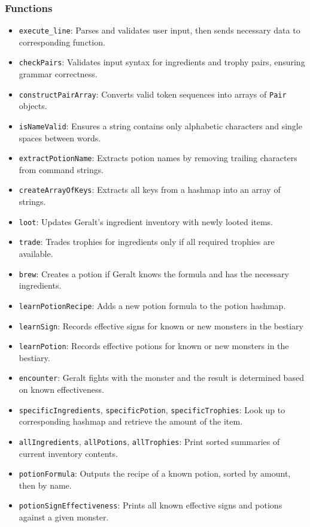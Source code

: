 \documentclass[a4paper,12pt]{article}
\begin{document}
\subsubsection{Functions}
\begin{itemize}
  \item \texttt{execute\_line}: Parses and validates user input, then sends necessary data to corresponding function.
  \item \texttt{checkPairs}: Validates input syntax for ingredients and trophy pairs, ensuring grammar correctness.
  \item \texttt{constructPairArray}: Converts valid token sequences into arrays of \texttt{Pair} objects.
  \item \texttt{isNameValid}: Ensures a string contains only alphabetic characters and single spaces between words.
  \item \texttt{extractPotionName}: Extracts potion names by removing trailing characters from command strings.
  \item \texttt{createArrayOfKeys}: Extracts all keys from a hashmap into an array of strings.
  \item \texttt{loot}: Updates Geralt's ingredient inventory with newly looted items.
  \item \texttt{trade}: Trades trophies for ingredients only if all required trophies are available.
  \item \texttt{brew}: Creates a potion if Geralt knows the formula and has the necessary ingredients.
  \item \texttt{learnPotionRecipe}: Adds a new potion formula to the potion hashmap.
  \item \texttt{learnSign}: Records effective signs for known or new monsters in the bestiary
  \item \texttt{learnPotion}: Records effective potions for known or new monsters in the bestiary.
  \item \texttt{encounter}: Geralt fights with the monster and the result is determined based on known effectiveness.
  \item \texttt{specificIngredients}, \texttt{specificPotion}, \texttt{specificTrophies}: Look up to corresponding hashmap and retrieve the amount of the item.
  \item \texttt{allIngredients}, \texttt{allPotions}, \texttt{allTrophies}: Print sorted summaries of current inventory contents.
  \item \texttt{potionFormula}: Outputs the recipe of a known potion, sorted by amount, then by name.
  \item \texttt{potionSignEffectiveness}: Prints all known effective signs and potions against a given monster.
\end{itemize}
\end{document}
